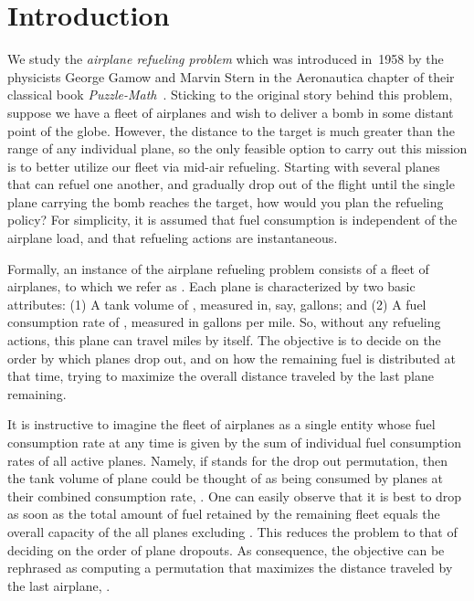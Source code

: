 \documentclass[11pt]{article}
\theoremstyle{plain}
\theoremstyle{definition}
\begin{document}
\section{Introduction} \label{sec:intro}

We study the \textit{airplane refueling problem} which was introduced in~1958 by the physicists George Gamow and Marvin Stern in the Aeronautica chapter of their classical book \textit{Puzzle-Math}~\cite{GamowS58}. Sticking to the original story behind this problem, suppose we have a fleet of airplanes and wish to deliver a bomb in some distant point of the globe. However, the distance to the target is much greater than the range of any individual plane, so the only feasible option to carry out this mission is to better utilize our fleet via mid-air refueling. Starting with several planes that can refuel one another, and gradually drop out of the flight until the single plane carrying the bomb reaches the target, how would you plan the refueling policy? For simplicity, it is assumed that fuel consumption is independent of the airplane load, and that refueling actions are instantaneous.

\smallskip {} Formally, an instance of the airplane refueling problem consists of a fleet of  airplanes, to which we refer as . Each plane  is characterized by two basic attributes: (1) A tank volume of , measured in, say, gallons; and (2) A fuel consumption rate of , measured in gallons per mile. So, without any refueling actions, this plane can travel  miles by itself. The objective is to decide on the order by which planes drop out, and on how the remaining fuel is distributed at that time, trying to maximize the overall distance traveled by the last plane remaining.

It is instructive to imagine the fleet of airplanes as a single entity whose fuel consumption rate at any time is given by the sum of individual fuel consumption rates of all active planes. Namely, if  stands for the drop out permutation, then the tank volume  of plane  could be thought of as being consumed by planes  at their combined consumption rate, . One can easily observe that it is best to drop  as soon as the total amount of fuel retained by the remaining fleet equals the overall capacity of the all planes excluding . This reduces the problem to that of deciding on the order of plane dropouts. As consequence, the objective can be rephrased as computing a permutation  that maximizes the distance traveled by the last airplane, .
\end{document}
